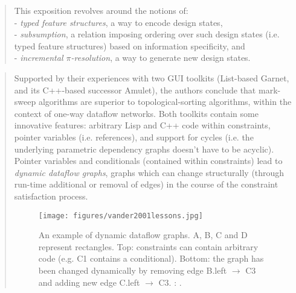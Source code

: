 		\begin{quote}
		\small
		This exposition revolves around the notions of:\\
		- {\em typed feature structures}, a way to encode design states,\\
		- {\em subsumption}, a relation imposing ordering over such design states 
		  (i.e. typed feature structures) based on information specificity, and\\
		- {\em incremental $\pi$-resolution}, a way to generate new design states.
		\end{quote}

		
		\begin{quote}
		\small
		Supported by their experiences with two GUI toolkits (List-based Garnet, and its 
		C++-based successor Amulet),
		the authors conclude that mark-sweep algorithms are superior to topological-sorting
		algorithms, within the context of one-way dataflow networks. Both toolkits 
		contain some innovative features: arbitrary Lisp and C++ code within constraints, 
		pointer variables
		(i.e. references), and support for cycles (i.e. the underlying parametric
		dependency graphs doesn't have to be acyclic). Pointer variables and
		conditionals (contained within constraints) lead to {\em dynamic dataflow graphs},
		graphs which can change structurally (through run-time additional or removal
		of edges) in the course of the constraint satisfaction process.
		
		\begin{figure}[htb]
		\begin{center}
		\texttt{[image: figures/vander2001lessons.jpg]}
		\caption{
		An example of dynamic dataflow graphs. 
		A, B, C and D represent rectangles.  
		Top: constraints can contain arbitrary code (e.g. C1 contains a conditional).
		Bottom: the graph has been changed dynamically by removing edge B.left $\rightarrow$ C3
		and adding new edge C.left $\rightarrow$ C3.
		\citeauthor{vander2001lessons}: 
		\cite{vander2001lessons}.}
		\label{fig:vander2001lessons}
		\end{center}
		\end{figure}
		
		\end{quote}

		

